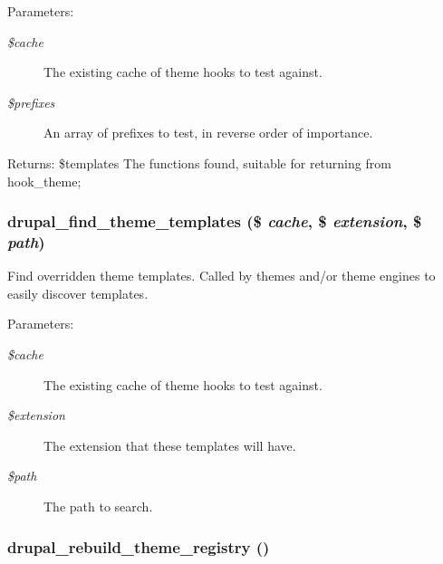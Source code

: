 \begin{Desc}
\item[Parameters:]
\begin{description}
\item[{\em \$cache}]The existing cache of theme hooks to test against. \item[{\em \$prefixes}]An array of prefixes to test, in reverse order of importance.\end{description}
\end{Desc}
\begin{Desc}
\item[Returns:]\$templates The functions found, suitable for returning from hook\_\-theme; \end{Desc}
\hypertarget{includes_2theme_8inc_a755f6e8f11a62c9e90a6d7af55145b1}{
\subsubsection[{drupal\_\-find\_\-theme\_\-templates}]{\setlength{\rightskip}{0pt plus 5cm}drupal\_\-find\_\-theme\_\-templates (\$ {\em cache}, \/  \$ {\em extension}, \/  \$ {\em path})}}
\label{includes_2theme_8inc_a755f6e8f11a62c9e90a6d7af55145b1}


Find overridden theme templates. Called by themes and/or theme engines to easily discover templates.

\begin{Desc}
\item[Parameters:]
\begin{description}
\item[{\em \$cache}]The existing cache of theme hooks to test against. \item[{\em \$extension}]The extension that these templates will have. \item[{\em \$path}]The path to search. \end{description}
\end{Desc}
\hypertarget{includes_2theme_8inc_46976f4dc489ea1376b8f623b270daa3}{
\subsubsection[{drupal\_\-rebuild\_\-theme\_\-registry}]{\setlength{\rightskip}{0pt plus 5cm}drupal\_\-rebuild\_\-theme\_\-registry ()}}
\label{includes_2theme_8inc_46976f4dc489ea1376b8f623b270daa3}



